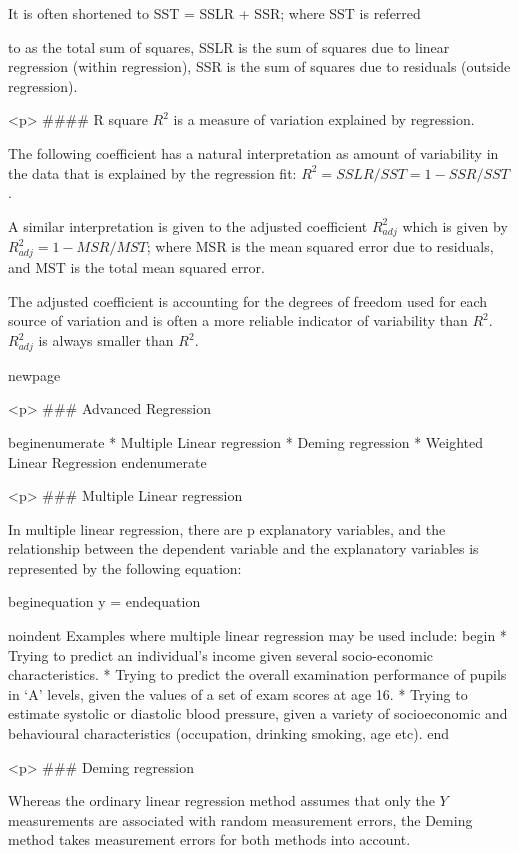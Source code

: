 It is often shortened to SST = SSLR + SSR; where SST is referred

to as the total sum of squares, SSLR is the sum of squares due to
linear regression (within regression), SSR is the sum of squares
due to residuals (outside regression).

<p>
#### {R square}
$R^2$ is a measure of variation explained by regression.

The following coefficient has a natural interpretation as amount
of variability in the data that is explained by the regression
fit: $R^2 = SSLR/SST = 1 - SSR/SST$.

A similar interpretation is given to the adjusted coefficient
$R^2_{adj}$ which is given by $R^2_{adj} = 1 - MSR/MST $; where
MSR is the mean squared error due to residuals, and MST is the
total mean squared error.

The adjusted coefficient is accounting for the degrees of freedom
used for each source of variation and is often a more reliable
indicator of variability than $R^2$. $R^2_{adj}$ is always smaller
than $R^2$.



newpage


<p>
### {Advanced Regression}

begin{enumerate}
	 *           Multiple Linear regression
	 *           Deming regression
	 *           Weighted Linear Regression
end{enumerate}


<p>
### {Multiple Linear regression}

In multiple linear regression, there are p explanatory variables, and the relationship
between the dependent variable and the explanatory variables is represented by the
following equation:

begin{equation}
y =
end{equation}


noindent Examples where multiple linear regression may be used include:
begin{ }
	 *           Trying to predict an individual’s income given several socio-economic
	characteristics.
	 *           Trying to predict the overall examination performance of pupils in ‘A’ levels, given
	the values of a set of exam scores at age 16.
	 *           Trying to estimate systolic or diastolic blood pressure, given a variety of socioeconomic
	and behavioural characteristics (occupation, drinking smoking, age
	etc).
end{ }

<p>
### {Deming regression}

Whereas the ordinary linear regression method assumes that only the $Y$ measurements are associated with random measurement errors, the Deming method takes measurement errors for both methods into account.



